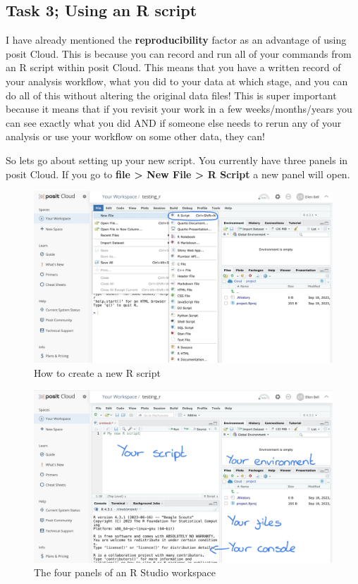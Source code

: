 \documentclass[
]{book}
\begin{document}
\subsection{Task 3; Using an R script}\label{using-an-r-script}

I have already mentioned the \textbf{reproducibility} factor as an advantage of using posit Cloud. This is because you can record and run all of your commands from an R script within posit Cloud. This means that you have a written record of your analysis workflow, what you did to your data at which stage, and you can do all of this without altering the original data files! This is super important because it means that if you revisit your work in a few weeks/months/years you can see exactly what you did AND if someone else needs to rerun any of your analysis or use your workflow on some other data, they can!

So lets go about setting up your new script. You currently have three panels in posit Cloud. If you go to \textbf{file \textgreater{} New File \textgreater{} R Script} a new panel will open.

\begin{figure}
\includegraphics[width=0.9\linewidth]{figures/posit6} \caption{How to create a new R script}\label{fig:unnamed-chunk-11}
\end{figure}

\begin{figure}
\includegraphics[width=0.9\linewidth]{figures/posit7} \caption{The four panels of an R Studio workspace}\label{fig:unnamed-chunk-12}
\end{figure}
\end{document}
